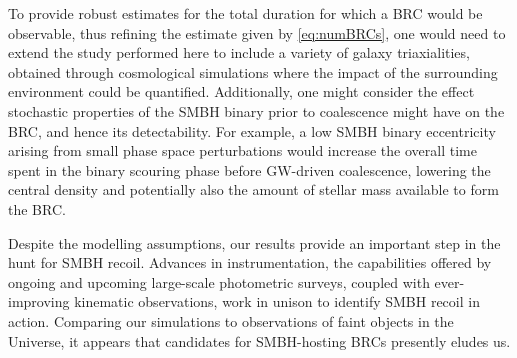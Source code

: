 \documentclass[twocolumn]{aastex631}
\begin{document}
To provide robust estimates for the total duration for which a BRC would be observable, thus refining the estimate given by \autoref{eq:numBRCs}, one would need to extend the study performed here to include a variety of galaxy triaxialities, obtained through cosmological simulations where the impact of the surrounding environment could be quantified.
Additionally, one might consider the effect stochastic properties of the SMBH binary prior to coalescence might have on the BRC, and hence its detectability.
For example, a low SMBH binary eccentricity arising from small phase space perturbations \citep[e.g.][]{rawlings2023} would increase the overall time spent in the binary scouring phase before GW-driven coalescence, lowering the central density \citep{rantala2024} and potentially also the amount of stellar mass available to form the BRC. 


Despite the modelling assumptions, our results provide an important step in the hunt for SMBH recoil. 
Advances in instrumentation, the capabilities offered by ongoing and upcoming large-scale photometric surveys, coupled with ever-improving kinematic observations, work in unison to identify SMBH recoil in action. 
Comparing our simulations to observations of faint objects in the Universe, it appears that candidates for SMBH-hosting BRCs presently eludes us.


\end{document}

